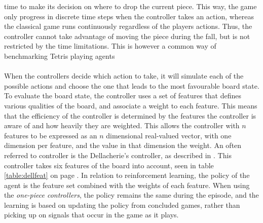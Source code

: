 time to make its decision on where to drop the current piece.
This way, the game only progress in discrete time steps
when the controller takes
an action, whereas the classical game runs continuously 
regardless of the players actions.
Thus, the controller cannot take advantage of moving the piece 
during the fall, but is not restricted by the time limitations.
This is however a common way of benchmarking Tetris playing agents
\citep{scherrer2009}\\
\\
When the controllers decide which action to take, it will
simulate each of the possible actions and choose the one that
leads to the most favourable board state. To evaluate the board 
state, the controller uses a set of features that defines 
various qualities of the board, and associate a weight to each 
feature. This means that the efficiency of the controller 
is determined by the features the controller is aware of
and how heavily they are weighted. This allows
the controller with $n$ features to be expressed as an 
$n$ dimensional real-valued vector, with one dimension 
per feature, and the value in that dimension the weight.
An often referred to controller is the Dellacherie's controller, 
as described in \cite{scherrer2009}. This controller
takes six features of the board into account, seen in table 
\ref{table:dellfeat} on page \pageref{table:dellfeat}. In relation 
to reinforcement learning, the policy of the agent is the feature set
combined with the weights of each feature. 
When using the \textit{one-piece controllers}, the policy remains 
the same during the episode, and the learning is based on updating
the policy from concluded games, rather than picking up on signals
that occur in the game as it plays.





